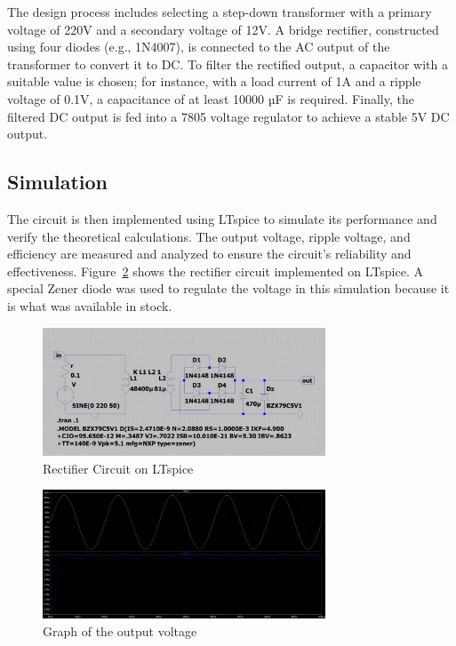 \documentclass{zc-ust-hw}
\begin{document}
The design process includes selecting a step-down transformer with a primary
voltage of 220V and a secondary voltage of 12V. A bridge rectifier, constructed
using four diodes (e.g., 1N4007), is connected to the AC output of the
transformer to convert it to DC. To filter the rectified output, a capacitor
with a suitable value is chosen; for instance, with a load current of 1A and a
ripple voltage of 0.1V, a capacitance of at least 10000 µF is required.
Finally, the filtered DC output is fed into a 7805 voltage regulator to achieve
a stable 5V DC output.

\subsection{Simulation}

The circuit is then implemented using LTspice to simulate its performance and
verify the theoretical calculations. The output voltage, ripple voltage, and
efficiency are measured and analyzed to ensure the circuit's reliability and
effectiveness. Figure~\ref{fig:ltspice-circuit} shows the rectifier circuit
implemented on LTspice. A special Zener diode was used to regulate the voltage
in this simulation because it is what was available in stock. 

\begin{figure}[h]
  \begin{center}
    \includegraphics[width=0.75\textwidth]{figures/photo_2024-05-24_00-16-34.jpg}
  \end{center}
  \caption{Rectifier Circuit on LTspice}
  \label{fig:ltspice-circuit}
\end{figure}

\begin{figure}[h]
  \begin{center}
    \includegraphics[width=0.75\textwidth]{figures/photo_2024-05-24_00-16-35.jpg}
  \end{center}
  \caption{Graph of the output voltage}
  \label{fig:ltspice-circuit}
\end{figure}
\end{document}
